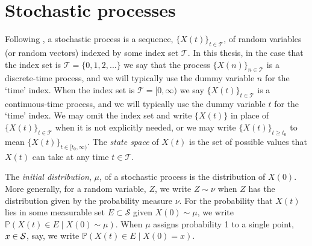 		
\section{Stochastic processes}






Following \cite{rossBook}, a stochastic process is a sequence, \(\{X(t)\}_{t\in\mathcal T}\), of random variables (or random vectors) indexed by some index set \(\mathcal T\). In this thesis, in the case that the index set is \(\mathcal T=\{0,1,2,...\}\) we say that the process \(\{X(n)\}_{n\in \mathcal T}\) is a discrete-time process, and we will typically use the dummy variable \(n\) for the `time' index. When the index set is \(\mathcal T=[0,\infty)\) we say \(\{X(t)\}_{t\in\mathcal T}\) is a continuous-time process, and we will typically use the dummy variable \(t\) for the `time' index. We may omit the index set and write \(\{X(t)\}\) in place of \(\{X(t)\}_{t\in\mathcal T}\) when it is not explicitly needed, or we may write \(\{X(t)\}_{t\geq t_0}\) to mean \(\{X(t)\}_{t\in[t_0,\infty)}\). The \emph{state space} of \(X(t)\) is the set of possible values that \(X(t)\) can take at any time \(t\in\mathcal T\).

The \emph{initial distribution}, \(\mu\), of a stochastic process is the distribution of \(X(0)\). More generally, for a random variable, \(Z\), we write \(Z\sim \nu\) when \(Z\) has the distribution given by the probability measure \(\nu\). For the probability that \(X(t)\) lies in some measurable set \(E\subset \mathcal S\) given \(X(0)\sim \mu\), we write \(\mathbb P(X(t)\in E \mid X(0)\sim \mu)\). When \(\mu\) assigns probability 1 to a single point, \(x\in\mathcal{S}\), say, we write \(\mathbb P(X(t)\in E \mid X(0)=x).\) 

